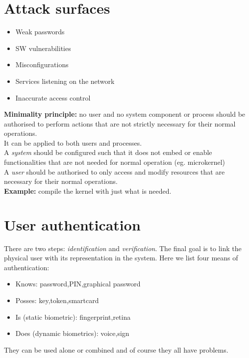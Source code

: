 \documentclass[10pt,a4paper]{book}
\begin{document}
\section{Attack surfaces}
\begin{itemize}[noitemsep]
\item Weak passwords
\item SW vulnerabilities
\item Misconfigurations
\item Services listening on the network
\item Inaccurate access control
\end{itemize}
\textbf{Minimality principle:} no user and no system component or process should be authorised to perform actions that are not strictly necessary for their normal operations.\\
It can be applied to both users and processes.\\
A \emph{system} should be configured such that it does not embed or enable functionalities that are not needed for normal operation (eg. microkernel)\\
A \emph{user} should be authorised to only access and modify resources that are necessary for their normal operations.\\
\textbf{Example:} compile the kernel with just what is needed.
\section{User authentication}
There are two steps: \emph{identification} and \emph{verification}. The final goal is to link the physical user with its representation in the system. Here we list four means of authentication:
\begin{itemize}[noitemsep,nolistsep]
\item Knows: password,PIN,graphical password
\item Posses: key,token,smartcard
\item Is (static biometric): fingerprint,retina
\item Does (dynamic biometrics): voice,sign
\end{itemize}
They can be used alone or combined and of course they all have problems.
\end{document}
